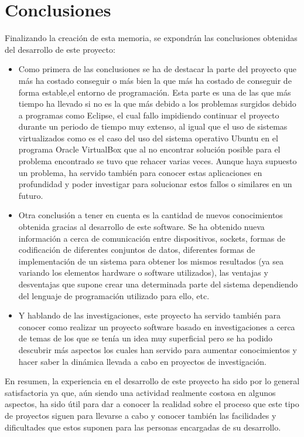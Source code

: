 \section{Conclusiones}
Finalizando la creación de esta memoria, se expondrán las conclusiones obtenidas del desarrollo de este proyecto:
\begin{itemize}
	\item Como primera de las conclusiones se ha de destacar la parte del proyecto que más ha costado conseguir o más bien la que más ha costado de conseguir de forma estable,el entorno de programación. Esta parte es una de las que más tiempo ha llevado si no es la que más debido a los problemas surgidos debido a programas como Eclipse, el cual fallo impidiendo continuar el proyecto durante un periodo de tiempo muy extenso, al igual que el uso de sistemas virtualizados como es el caso del uso del sistema operativo Ubuntu en el programa Oracle VirtualBox que al no encontrar solución posible para el problema encontrado se tuvo que rehacer varias veces. Aunque haya supuesto un problema, ha servido también para conocer estas aplicaciones en profundidad y poder investigar para solucionar estos fallos o similares en un futuro.
	\item Otra conclusión a tener en cuenta es la cantidad de nuevos conocimientos obtenida gracias al desarrollo de este software. Se ha obtenido nueva información a cerca de comunicación entre dispositivos, sockets, formas de codificación de diferentes conjuntos de datos, diferentes formas de implementación de un sistema para obtener los mismos resultados (ya sea variando los elementos hardware o software utilizados), las ventajas y desventajas que supone crear una determinada parte del sistema dependiendo del lenguaje de programación utilizado para ello, etc.
	\item Y hablando de las investigaciones, este proyecto ha servido también para conocer como realizar un proyecto software basado en investigaciones a cerca de temas de los que se tenía un idea muy superficial pero se ha podido descubrir más aspectos los cuales han servido para aumentar conocimientos y hacer saber la dinámica llevada a cabo en proyectos de investigación. 
\end{itemize}
En resumen, la experiencia en el desarrollo de este proyecto ha sido por lo general satisfactoria ya que, aún siendo una actividad realmente costosa en algunos aspectos, ha sido útil para dar a conocer la realidad sobre el proceso que este tipo de proyectos siguen para llevarse a cabo y conocer también las facilidades y dificultades que estos suponen para las personas encargadas de su desarrollo.

